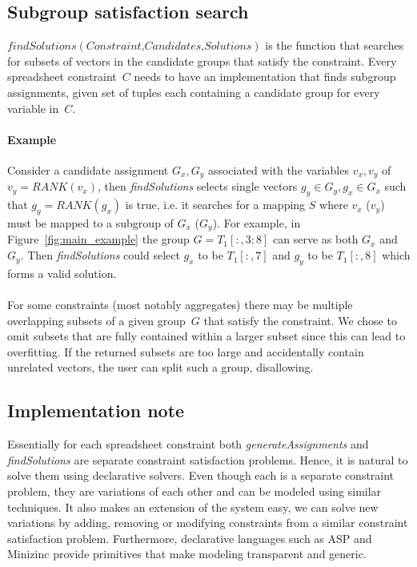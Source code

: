 \documentclass{ecai}
\newcommand{\format}[1]{\textit{#1}\xspace}
\newcommand{\generategroups}{\format{generateAssignments}}
\newcommand{\findassignment}{\format{findSolutions}}
\newcommand{\range}[3]{\ensuremath{#1[#2,#3]}}
\newcommand{\rangeto}[2]{#1{:}#2}
\newcommand{\rangeall}{:}
\newcommand{\eccalc}[2]{\ensuremath{#1 = #2}}
\newcommand{\ecrank}[2]{\eccalc{#1}{\mathit{RANK}(#2)}}
\begin{document}
\subsection{Subgroup satisfaction search}
$\findassignment(\textit{Constraint,Candidates,Solutions})$ is the function that searches for subsets of vectors in the candidate groups that satisfy the constraint.
Every spreadsheet constraint~$C$ needs to have an implementation that finds subgroup assignments, given set of tuples each containing a candidate group for every variable in~$C$.

\paragraph{Example}
Consider a candidate assignment $G_x, G_y$ associated with the variables $v_x,v_y$ of \ecrank{v_y}{v_x}, then \findassignment selects single vectors $g_y \in G_y, g_x \in G_x$ such that \ecrank{g_y}{g_x} is true, i.e. it searches for a mapping $S$ where $v_x$ ($v_y$) must be mapped to a subgroup of $G_x$ ($G_y$).
For example, in Figure~\ref{fig:main_example} the group $G = \range{T_1}{\rangeall}{\rangeto{3}{8}}$ can serve as both $G_x$ and $G_y$.
Then \findassignment could select $g_x$ to be $\range{T_1}{\rangeall}{7}$ and $g_y$ to be $\range{T_1}{\rangeall}{8}$ which forms a valid solution.
\\\\
For some constraints (most notably aggregates) there may be multiple overlapping subsets of a given group~$G$ that satisfy the constraint.
We chose to omit subsets that are fully contained within a larger subset since this can lead to overfitting.
If the returned subsets are too large and accidentally contain unrelated vectors, the user can split such a group, disallowing.

\subsection{Implementation note} Essentially for each spreadsheet constraint both \generategroups and \findassignment are separate constraint satisfaction problems. Hence, it is natural to solve them using declarative solvers. Even though each is a separate constraint problem, they are variations of each other and can be modeled using similar techniques. It also makes an extension of the system easy, we can solve new variations by adding, removing or modifying constraints from a similar constraint satisfaction problem. Furthermore, declarative languages such as ASP \cite{whaisasp} and Minizinc \cite{minizinc} provide primitives that make modeling transparent and generic.
\end{document}
